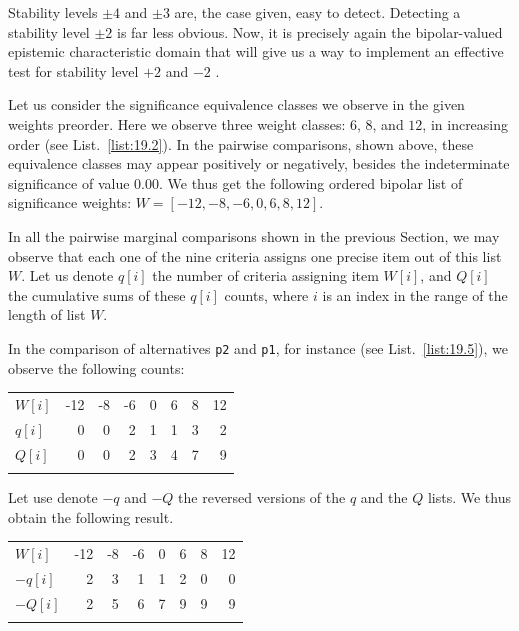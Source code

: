 Stability levels $\pm 4$ and $\pm 3$ are, the case given, easy to detect. Detecting a stability level $\pm 2$ is far less obvious.  Now, it is precisely again the bipolar-valued epistemic characteristic domain that will give us a way to implement an effective test for stability level $+2$ and $-2$ \citep{BIS-2004b,BIS-2004c}. 

Let us consider the significance equivalence classes we observe in the given weights preorder. Here we observe three weight classes: $6$, $8$, and $12$, in increasing order (see List.~\vref{list:19.2}). In the pairwise comparisons, shown above, these equivalence classes may appear positively or negatively, besides the indeterminate significance of value $0.00$. We thus get the following ordered bipolar list of significance weights: $W = [-12, -8, -6, 0, 6, 8, 12]$.

In all the pairwise marginal comparisons shown in the previous Section, we may observe that each one of the nine criteria assigns one precise item out of this list $W$. Let us denote $q[i]$ the number of criteria assigning item $W[i]$, and $Q[i]$ the cumulative sums of these $q[i]$ counts, where $i$ is an index in the range of the length of list $W$.

In the comparison of alternatives \texttt{p2} and \texttt{p1}, for instance (see List.~\vref{list:19.5}), we observe the following counts: \hfill
\begin{center}
\begin{tabular}{l|r|r|r|r|r|r|r}
 \svhline\noalign{\smallskip}
  $W[i]$ & -12 & -8  & -6  &  0  &  6  &  8 &  12\\  
 \noalign{\smallskip}\hline\noalign{\smallskip}
$q[i]$  &  0 &  0 &   2 &   1  &  1  &  3  &  2 \\
$Q[i]$  &  0 &  0 &   2 &   3  &  4  &  7  &  9 \\
      \noalign{\smallskip}\hline
\end{tabular}
\end{center}

Let use denote $-q$ and $-Q$ the reversed versions of the $q$ and the $Q$ lists. We thus obtain the following result.\hfill
\begin{center}
\begin{tabular}{l|r|r|r|r|r|r|r}
 \svhline\noalign{\smallskip}
  $W[i]$ & -12 & -8  & -6  &  0  &  6  &  8 &  12\\  
 \noalign{\smallskip}\hline\noalign{\smallskip}
  $-q[i]$  &  2 &  3 &   1 &   1  &  2  &  0  &  0 \\
  $-Q[i]$  &  2 &  5 &   6 &   7  &  9  &  9  &  9 \\
 \noalign{\smallskip}\hline
\end{tabular}
\end{center}

